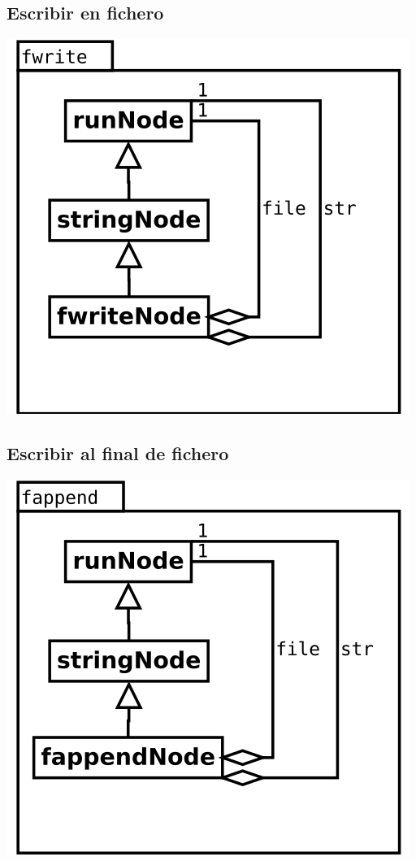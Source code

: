 \subsection {Escribir en fichero} 
\begin{center}
\includegraphics[scale=0.4]{fwrite.png} \\
\end{center}

\subsection {Escribir al final de fichero} 
\begin{center}
\includegraphics[scale=0.4]{fappend.png} \\
\end{center}

